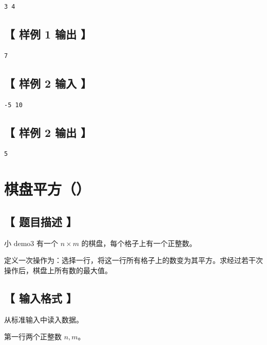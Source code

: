 \documentclass{statement}
\begin{document}
\begin{verbatim}
3 4
\end{verbatim}


\subsection[ 样例 1 输出 ]{【 样例 1 输出 】}

\begin{verbatim}
7
\end{verbatim}


\subsection[ 样例 2 输入 ]{【 样例 2 输入 】}

\begin{verbatim}
-5 10
\end{verbatim}


\subsection[ 样例 2 输出 ]{【 样例 2 输出 】}

\begin{verbatim}
5
\end{verbatim}



\newpage

\section{ 棋盘平方（）}

\subsection[ 题目描述 ]{【 题目描述 】}

小 $\text{demo3}$ 有一个 $n \times m$ 的棋盘，每个格子上有一个正整数。

定义一次操作为：选择一行，将这一行所有格子上的数变为其平方。求经过若干次操作后，棋盘上所有数的最大值。


\subsection[ 输入格式 ]{【 输入格式 】}

从标准输入中读入数据。

第一行两个正整数 $n, m$。
\end{document}
